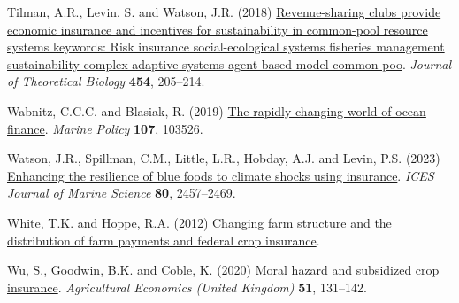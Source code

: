 \documentclass[
  letterpaper,
  DIV=11,
  numbers=noendperiod]{scrartcl}
\newlength{\cslhangindent}
\newlength{\cslentryspacingunit} %
\newenvironment{CSLReferences}[2] %
 {%
  \setlength{\parindent}{0pt}
  \ifodd #1
  \let\oldpar\par
  \def\par{\hangindent=\cslhangindent\oldpar}
  \fi
  \setlength{\parskip}{#2\cslentryspacingunit}
 }%
 {}
\theoremstyle{plain}
\theoremstyle{plain}
\theoremstyle{remark}
\begin{document}
\begin{CSLReferences}{1}{0}
\leavevmode{}%
Tilman, A.R., Levin, S. and Watson, J.R. (2018)
\href{https://doi.org/10.1016/j.jtbi.2018.06.003}{Revenue-sharing clubs
provide economic insurance and incentives for sustainability in
common-pool resource systems keywords: Risk insurance social-ecological
systems fisheries management sustainability complex adaptive systems
agent-based model common-poo}. \emph{Journal of Theoretical Biology}
\textbf{454}, 205--214.

\leavevmode{}%
Wabnitz, C.C.C. and Blasiak, R. (2019)
\href{https://doi.org/10.1016/j.marpol.2019.103526}{The rapidly changing
world of ocean finance}. \emph{Marine Policy} \textbf{107}, 103526.

\leavevmode{}%
Watson, J.R., Spillman, C.M., Little, L.R., Hobday, A.J. and Levin, P.S.
(2023) \href{https://doi.org/10.1093/icesjms/fsad175}{Enhancing the
resilience of blue foods to climate shocks using insurance}. \emph{ICES
Journal of Marine Science} \textbf{80}, 2457--2469.

\leavevmode{}%
White, T.K. and Hoppe, R.A. (2012)
\href{https://www.ers.usda.gov}{Changing farm structure and the
distribution of farm payments and federal crop insurance}.

\leavevmode{}%
Wu, S., Goodwin, B.K. and Coble, K. (2020)
\href{https://doi.org/10.1111/agec.12545}{Moral hazard and subsidized
crop insurance}. \emph{Agricultural Economics (United Kingdom)}
\textbf{51}, 131--142.

\end{CSLReferences}
\end{document}
